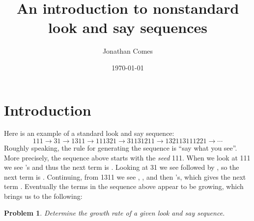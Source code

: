 \documentclass[reqno]{amsart}
\newtheorem{problem}{Problem}
\theoremstyle{definition}
\newcommand{\red}[1]{{\color{red}{#1}}}
\newcommand{\blue}[1]{{\color{blue}{#1}}}
\begin{document}
\title{An introduction to nonstandard look and say sequences}


\author[Comes]{Jonathan Comes}

\date{\today}






\maketitle  


\section{Introduction}\label{section: Introduction}

Here is an example of a standard look and say sequence:
\begin{equation}\label{equation: standard las 111}
    111\to 31\to 1311\to 111321\to 31131211\to 132113111221\to\cdots
\end{equation}
Roughly speaking, the rule for generating the sequence is ``say what you see''. More precisely, the sequence above starts with the \emph{seed} 111. When we look at 111 we see \red{three} \blue{1}'s and thus the next term is \red{3}\blue{1}. Looking at 31 we see \red{one} \blue{3} followed by \red{one} \blue{1}, so the next term is \red{1}\blue{3}\red{1}\blue{1}. Continuing, from 1311 we see \red{one} \blue{1}, \red{one} \blue{3}, and then \red{two} \blue{1}'s, which gives the next term \red{1}\blue{1}\red{1}\blue{3}\red{2}\blue{1}. Eventually the terms in the sequence above appear to be growing, which brings us to the following:

\begin{problem}\label{problem: growth rate}
    Determine the growth rate of a given look and say sequence.
\end{problem}
\end{document}
